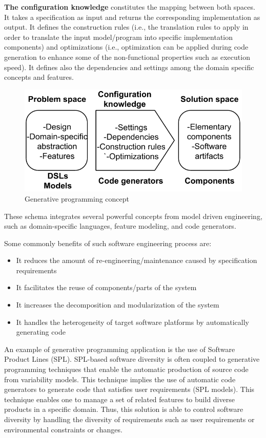 \textbf{The configuration knowledge} constitutes the mapping between both spaces. It takes a specification as input and returns the corresponding implementation as output. It defines the construction rules (i.e., the translation rules to apply in order to translate the input model/program into specific implementation components) and optimizations (i.e., optimization can be applied during code generation to enhance some of the non-functional properties such as execution speed). It defines also the dependencies and settings among the domain specific concepts and features.

\begin{figure}[h]
	\center
	\includegraphics[scale=0.65]{Background/fig/GDM.pdf}
	\caption{Generative programming concept}
	\label{fig:GDM}
\end{figure}
These schema integrates several powerful concepts from model driven engineering, such as domain-specific languages, feature modeling, and code generators.

Some commonly benefits of such software engineering process are:
\begin{itemize}
\item It reduces the amount of re-engineering/maintenance caused by specification requirements
\item It facilitates the reuse of components/parts of the system
\item It increases the decomposition and modularization of the system
\item It handles the heterogeneity of target software platforms by automatically generating code
\end{itemize}

An example of generative programming application is the use of Software Product Lines (SPL)\cite{schaefer2012software}.
SPL-based software diversity is often coupled to generative programming techniques\cite{Czarnecki:2000:GPM:345203} that enable the automatic production of source code from variability models. This technique implies the use of automatic code generators to generate code that satisfies user requirements (SPL models).
This technique enables one to manage a set of related features to build diverse products in a specific domain. Thus, this solution is able to control software diversity by handling the diversity of requirements such as user requirements or environmental constraints or changes. 

